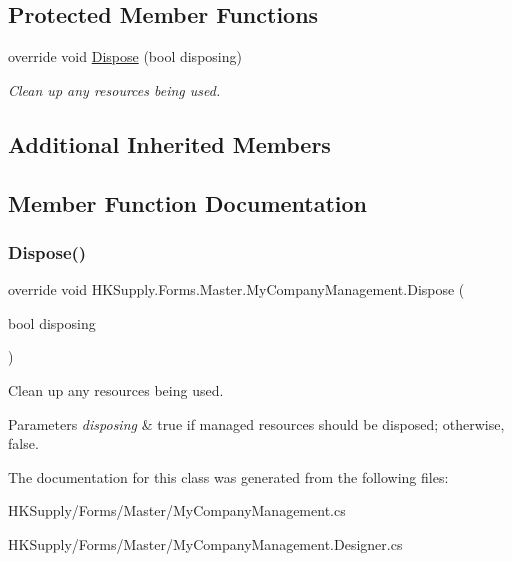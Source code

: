 \subsection*{Protected Member Functions}
\begin{DoxyCompactItemize}
\item 
override void \mbox{\hyperlink{class_h_k_supply_1_1_forms_1_1_master_1_1_my_company_management_af08f8dea55be30bd9da69c48f053bc6b}{Dispose}} (bool disposing)
\begin{DoxyCompactList}\small\item\em Clean up any resources being used. \end{DoxyCompactList}\end{DoxyCompactItemize}
\subsection*{Additional Inherited Members}


\subsection{Member Function Documentation}
\mbox{\label{class_h_k_supply_1_1_forms_1_1_master_1_1_my_company_management_af08f8dea55be30bd9da69c48f053bc6b}} 
\subsubsection{\texorpdfstring{Dispose()}{Dispose()}}
{\footnotesize\ttfamily override void H\+K\+Supply.\+Forms.\+Master.\+My\+Company\+Management.\+Dispose (\begin{DoxyParamCaption}\item[{bool}]{disposing }\end{DoxyParamCaption})\hspace{0.3cm}{\ttfamily [protected]}}



Clean up any resources being used. 


\begin{DoxyParams}{Parameters}
{\em disposing} & true if managed resources should be disposed; otherwise, false.\\
\hline
\end{DoxyParams}


The documentation for this class was generated from the following files\+:\begin{DoxyCompactItemize}
\item 
H\+K\+Supply/\+Forms/\+Master/My\+Company\+Management.\+cs\item 
H\+K\+Supply/\+Forms/\+Master/My\+Company\+Management.\+Designer.\+cs\end{DoxyCompactItemize}
